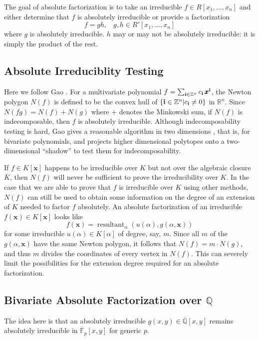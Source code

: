 \documentclass[11pt,reqno]{amsart}
\numberwithin{equation}{section}
\begin{document}
The goal of absolute factorization is to take an irreducible $f \in R[x_1, 
\dots, x_n]$ and either determine that $f$ is absolutely irreducible or provide 
a factorization
\begin{equation*}
f = g h \text{,} \quad g, h \in R'[x_1, \dots, x_n]
\end{equation*}
where $g$ is absolutely irreducible. $h$ may or may not be absolutely 
irreducible: it is simply the product of the rest.

\subsection{Absolute Irreduciblity Testing}
Here we follow Gao \cite{GAO}. For a multivariate polynomial $f = 
\sum_{\bold{i} \in \mathbb{Z}^n}{c_{\bold{i}} \, \pmb{x}^{\bold{i}}}$, the 
Newton polygon $N(f)$ is defined to be the convex hull of $\{\bold{i} \in 
\mathbb{Z}^n | c_{\bold{i}} \ne 0\}$ in $\mathbb{R}^n$.
Since $N(fg) = N(f) + N(g)$ where $+$ denotes the Minkowski sum, if $N(f)$ is 
indecomposable, then $f$ is absolutely irreducible. Although indecomposability 
testing is hard, Gao gives a reasonable algorithm in two dimensions 
\cite{GAO2}, that is, for bivariate polynomials, and projects higher 
dimensional polytopes onto a two-dimensional ``shadow'' to test them for 
indecomposability.

If $f \in K[\pmb{x}]$ happens to be irreducible over $K$ but not over the 
algebraic closure $\overline{K}$, then $N(f)$ will never be sufficient to prove 
the irreducibility over $K$. In the case that we are able to prove that $f$ is 
irreducible over $K$ using other methods, $N(f)$ can still be used to obtain 
some information on the degree of an extension of $K$ needed to factor $f$ 
absolutely. An absolute factorization of an irreducible $f(\pmb{x}) \in 
K[\pmb{x}]$ looks like
\begin{equation*}
f(\pmb{x}) = \operatorname{resultant}_{\alpha} (u(\alpha), g(\alpha, \pmb{x}))
\end{equation*}
for some irreducible $u(\alpha) \in K[\alpha]$ of degree, say, $m$. Since all 
$m$ of the $g(\alpha, \pmb{x})$ have the same Newton polygon, it follows that 
$N(f)=m\cdot N(g)$, and thus $m$ divides the coordinates of every vertex in 
$N(f)$. This can severely limit the possibilities for the extension degree 
required for an absolute factorization.

\subsection{Bivariate Absolute Factorization over $\mathbb{Q}$}
The idea here is that an absolutely irreducible $g(x,y) \in 
\overline{\mathbb{Q}}[x,y]$ remains absolutely irreducible in 
$\overline{\mathbb{F}}_p[x,y]$ for generic $p$.
\end{document}
